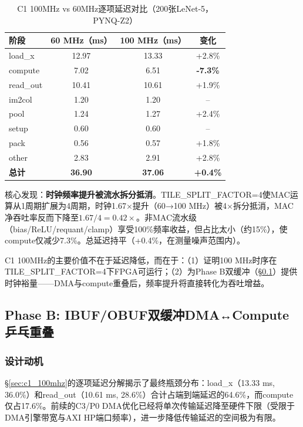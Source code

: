 \documentclass[12pt, a4paper]{article}
\begin{document}
\begin{table}[H]
    \centering
    \caption{C1 100MHz vs 60MHz逐项延迟对比（200张LeNet-5，PYNQ-Z2）}
    \label{tab:c1_100mhz}
    \small
    \begin{tabular}{lccc}
        \toprule
        阶段 & 60 MHz（ms） & 100 MHz（ms） & 变化 \\
        \midrule
        load\_x & 12.97 & 13.33 & +2.8\% \\
        compute & 7.02 & 6.51 & \textbf{-7.3\%} \\
        read\_out & 10.41 & 10.61 & +1.9\% \\
        im2col & 1.20 & 1.20 & -- \\
        pool & 1.24 & 1.27 & +2.4\% \\
        setup & 0.60 & 0.60 & -- \\
        pack & 0.56 & 0.57 & +1.8\% \\
        other & 2.83 & 2.91 & +2.8\% \\
        \midrule
        \textbf{总计} & \textbf{36.90} & \textbf{37.06} & \textbf{+0.4\%} \\
        \bottomrule
    \end{tabular}
\end{table}

核心发现：\textbf{时钟频率提升被流水拆分抵消}。TILE\_SPLIT\_FACTOR=4使MAC运算从1周期扩展为4周期，时钟1.67×提升（60→100 MHz）被4×拆分抵消，MAC净吞吐率反而下降至$1.67/4 = 0.42\times$。非MAC流水级（bias/ReLU/requant/clamp）享受100\%频率收益，但占比太小（约15\%），使compute仅减少7.3\%。总延迟持平（+0.4\%，在测量噪声范围内）。

C1 100MHz的主要价值不在于延迟降低，而在于：（1）证明100 MHz时序在TILE\_SPLIT\_FACTOR=4下FPGA可运行；（2）为Phase B双缓冲（§\ref{sec:phase_b}）提供时钟裕量——DMA与compute重叠后，频率提升将直接转化为吞吐增益。

\subsection{Phase B: IBUF/OBUF双缓冲DMA↔Compute乒乓重叠}
\label{sec:phase_b}

\subsubsection{设计动机}

§\ref{sec:c1_100mhz}的逐项延迟分解揭示了最终瓶颈分布：load\_x（13.33 ms, 36.0\%）和read\_out（10.61 ms, 28.6\%）合计占端到端延迟的64.6\%，而compute仅占17.6\%。前续的C3/P0 DMA优化已经将单次传输延迟降至硬件下限（受限于DMA引擎带宽与AXI HP端口频率），进一步降低传输延迟的空间极为有限。
\end{document}
